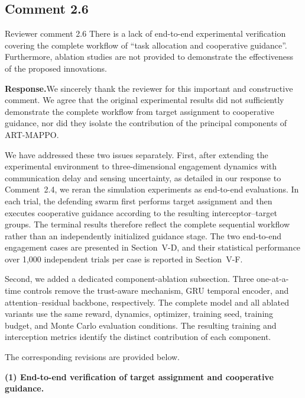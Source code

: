 \documentclass[11pt]{article}
\newcommand{\rsp}{\medskip\noindent\textbf{Response.}\quad}
\begin{document}

\subsection*{Comment 2.6}

\begin{reviewercomment}{Reviewer comment 2.6}
There is a lack of end-to-end experimental verification covering the
complete workflow of ``task allocation and cooperative guidance''.
Furthermore, ablation studies are not provided to demonstrate the
effectiveness of the proposed innovations.
\end{reviewercomment}

\rsp We sincerely thank the reviewer for this important and constructive
comment. We agree that the original experimental results did not sufficiently
demonstrate the complete workflow from target assignment to cooperative
guidance, nor did they isolate the contribution of the principal components
of ART-MAPPO.

We have addressed these two issues separately. First, after extending the
experimental environment to three-dimensional engagement dynamics with
communication delay and sensing uncertainty, as detailed in our response to
Comment~2.4, we reran the simulation experiments as end-to-end evaluations.
In each trial, the defending swarm first performs target assignment and then
executes cooperative guidance according to the resulting interceptor--target
groups. The terminal results therefore reflect the complete sequential
workflow rather than an independently initialized guidance stage. The two
end-to-end engagement cases are presented in Section~V-D, and their
statistical performance over 1,000 independent trials per case is reported
in Section~V-F.

Second, we added a dedicated component-ablation subsection. Three
one-at-a-time controls remove the trust-aware mechanism, GRU temporal
encoder, and attention--residual backbone, respectively. The complete model
and all ablated variants use the same reward, dynamics, optimizer, training
seed, training budget, and Monte Carlo evaluation conditions. The resulting
training and interception metrics identify the distinct contribution of each
component.

The corresponding revisions are provided below.

\medskip
\noindent\textbf{(1) End-to-end verification of target assignment and
cooperative guidance.}
\end{document}
